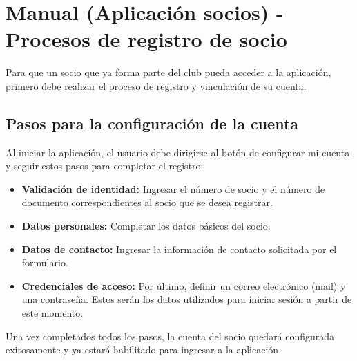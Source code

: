 \section{Manual (Aplicación socios) - Procesos de registro de socio}

Para que un socio que ya forma parte del club pueda acceder a la aplicación, primero debe realizar el proceso de registro y vinculación de su cuenta.

\subsection{Pasos para la configuración de la cuenta}
Al iniciar la aplicación, el usuario debe dirigirse al botón de configurar mi cuenta y seguir estos pasos para completar el registro:

\begin{itemize}
    \item \textbf{Validación de identidad:} Ingresar el número de socio y el número de documento correspondientes al socio que se desea registrar.
    \item \textbf{Datos personales:} Completar los datos básicos del socio.
    \item \textbf{Datos de contacto:} Ingresar la información de contacto solicitada por el formulario.
    \item \textbf{Credenciales de acceso:} Por último, definir un correo electrónico (mail) y una contraseña. Estos serán los datos utilizados para iniciar sesión a partir de este momento.
\end{itemize}

Una vez completados todos los pasos, la cuenta del socio quedará configurada exitosamente y ya estará habilitado para ingresar a la aplicación.
